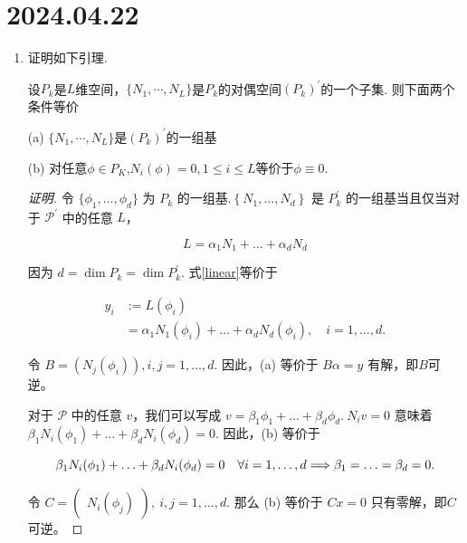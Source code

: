 \documentclass[12pt,a4paper]{article}
\begin{document}
	
	\noindent
	
	\section*{2024.04.22}	
	
	\begin{enumerate}
		\item 证明如下引理.
		
		设$P_k$是$L$维空间，$\{N_1,\cdots,N_L\}$是$P_k$的对偶空间$(P_k)^{\prime}$的一个子集. 则下面两个条件等价
		
		(a) $\{N_1,\cdots,N_L\}$是$(P_k)^{\prime}$的一组基
		
		(b) 对任意$\phi\in P_K$,$N_i(\phi)=0,1\leq i\leq L$等价于$\phi\equiv0.$
		
		\begin{proof}[证明]
			令 $\{\phi_1, \ldots , \phi_d\} $ 为 $P_k$ 的一组基.$\left\{N_1,\ldots,N_d\right\}$ 是 $P_k^{\prime}$ 的一组基当且仅当对于 $\mathcal{P} ^{\prime}$ 中的任意 $L$，
			
			\begin{equation}
				L=\alpha_1N_1+\ldots+\alpha_dN_d  \label{linear}
			\end{equation}
			
			因为 $d= \dim P_k = \dim P_k ^{\prime}$. 式\eqref{linear}等价于
			
			\begin{equation}
				\begin{aligned}
					y_i &:= L(\phi_i) \\
					&= \alpha_1N_1(\phi_i)+\ldots+\alpha_dN_d(\phi_i),\quad i=1,\ldots,d.
				\end{aligned}
			\end{equation}
			
			
			令 $B=\left(N_j(\phi_i)\right),i,j=1,\ldots,d.$ 因此，(a) 等价于 $B\alpha=y$ 有解，即$B$可逆。
			
			对于 $\mathcal{P}$ 中的任意 $v$，我们可以写成 $v=\beta_1\phi_1+\ldots+\beta_d\phi_d.~N_iv=0$ 意味着 $\beta_1N_i(\phi_1)+\ldots+\beta_dN_i(\phi_d)=0.$ 因此，(b) 等价于
			
			\begin{equation}
				\beta_{1}N_{i}(\phi_{1})+\ldots+\beta_{d}N_{i}(\phi_{d})=0\quad\forall i=1,\ldots,d\\\Longrightarrow\beta_{1}=\ldots=\beta_{d}=0.
			\end{equation}
			
			令 $C=\begin{pmatrix}N_i(\phi_j)\end{pmatrix},\:i,j=1,\ldots,d.$ 那么 (b) 等价于 $Cx=0$ 只有零解，即$C$可逆。
			

\end{proof}
\end{enumerate}
\end{document}
